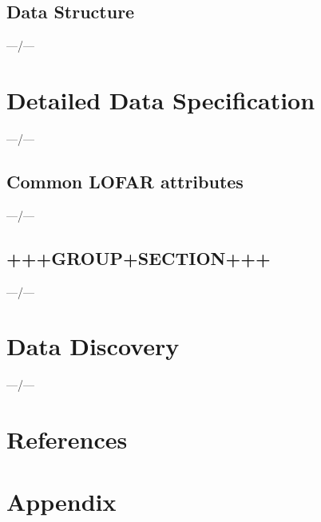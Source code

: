 \documentclass[a4paper,10pt,bibtotoc]{scrartcl}
\begin{document}




\subsection{Data Structure}

---/---

\newpage
\section{Detailed Data Specification}

---/---

\subsection{Common LOFAR attributes}



---/---
\newpage

\subsection{+++GROUP+SECTION+++}
---/---


\newpage
\section{Data Discovery}

---/---

\newpage
\section{References}





\newpage
\appendix
\section{Appendix}
\end{document}
